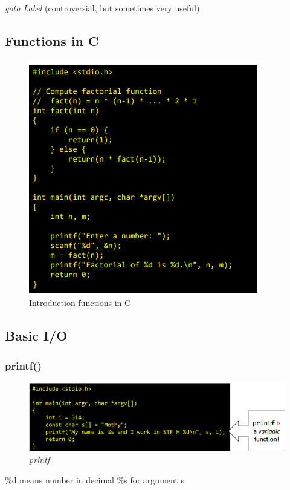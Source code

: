 \documentclass[a4paper,10pt]{article}
\begin{document}
\textit{goto Label} (controversial, but sometimes very useful)
\pagebreak

\subsection{Functions in C}
\begin{figure}[h]
    \centering
    \includegraphics[width=0.75\linewidth]{e6.png}
    \caption{Introduction functions in C}
    \label{fig:enter-label}
\end{figure}

\subsection{Basic I/O}
\subsubsection{printf()}
\begin{figure}[h]
    \centering
    \includegraphics[width=1\linewidth]{e7.png}
    \caption{\textit{printf}}
    \label{fig:enter-label}
\end{figure}
\%d means number in decimal
\%s for argument s
\end{document}
